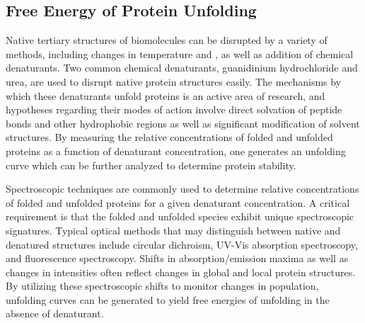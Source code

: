 \documentclass[nobib,nofonts,nols,nohyper]{tufte-handout}
\begin{document}

\subsection{Free Energy of Protein Unfolding} %
\label{sub:free_energy_of_protein_unfolding}

Native tertiary structures of biomolecules can be disrupted by a variety of methods, including changes in temperature and \pH, as well as addition of chemical denaturants. 
Two common chemical denaturants, guanidinium hydrochloride and urea, are used to disrupt native protein structures easily. 
The mechanisms by which these denaturants unfold proteins is an active area of research, and hypotheses regarding their modes of action involve direct solvation of peptide bonds and other hydrophobic regions as well as significant modification of solvent structures. 
By measuring the relative concentrations of folded and unfolded proteins as a function of denaturant concentration, one generates an unfolding curve which can be further analyzed to determine protein stability. 

Spectroscopic techniques are commonly used to determine relative concentrations of folded and unfolded proteins for a given denaturant concentration. 
A critical requirement is that the folded and unfolded species exhibit unique spectroscopic signatures. 
Typical optical methods that may distinguish between native and denatured structures include circular dichroism, UV-Vis absorption spectroscopy, and fluorescence spectroscopy. 
Shifts in absorption/emission maxima as well as changes in intensities often reflect changes in global and local protein structures. 
By utilizing these spectroscopic shifts to monitor changes in population, unfolding curves can be generated to yield free energies of unfolding in the absence of denaturant. 
\end{document}

